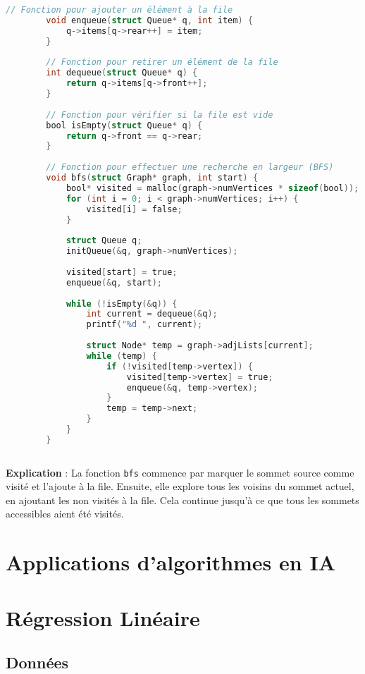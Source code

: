 \begin{enumerate}
\begin{lstlisting}[language=C]
		// Fonction pour ajouter un élément à la file
		void enqueue(struct Queue* q, int item) {
			q->items[q->rear++] = item;
		}
		
		// Fonction pour retirer un élément de la file
		int dequeue(struct Queue* q) {
			return q->items[q->front++];
		}
		
		// Fonction pour vérifier si la file est vide
		bool isEmpty(struct Queue* q) {
			return q->front == q->rear;
		}
		
		// Fonction pour effectuer une recherche en largeur (BFS)
		void bfs(struct Graph* graph, int start) {
			bool* visited = malloc(graph->numVertices * sizeof(bool));
			for (int i = 0; i < graph->numVertices; i++) {
				visited[i] = false;
			}
			
			struct Queue q;
			initQueue(&q, graph->numVertices);
			
			visited[start] = true;
			enqueue(&q, start);
			
			while (!isEmpty(&q)) {
				int current = dequeue(&q);
				printf("%d ", current);
				
				struct Node* temp = graph->adjLists[current];
				while (temp) {
					if (!visited[temp->vertex]) {
						visited[temp->vertex] = true;
						enqueue(&q, temp->vertex);
					}
					temp = temp->next;
				}
			}
		}
		
	\end{lstlisting}
	
	\textbf{Explication} :
	La fonction \texttt{bfs} commence par marquer le sommet source comme visité et l'ajoute à la file. Ensuite, elle explore tous les voisins du sommet actuel, en ajoutant les non visités à la file. Cela continue jusqu'à ce que tous les sommets accessibles aient été visités.
	
\end{enumerate}

\section{Applications d'algorithmes en IA}
	
\section*{Régression Linéaire}

\subsection*{Données}

